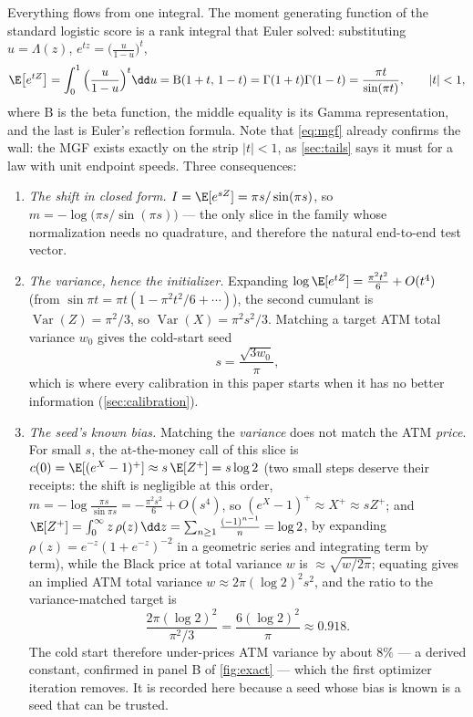 Everything flows from one integral.  The moment generating function of the
standard logistic score is a rank integral that Euler solved: substituting
$u=\Lambda(z)$, $e^{tz}=\big(\frac{u}{1-u}\big)^{t}$,
\begin{equation}
\E\big[e^{tZ}\big]
=\int_0^1\Big(\frac{u}{1-u}\Big)^{t}\dd u
=\mathrm{B}(1+t,\,1-t)
=\Gamma(1+t)\Gamma(1-t)
=\frac{\pi t}{\sin(\pi t)},
\qquad |t|<1,
\label{eq:mgf}
\end{equation}
where $\mathrm{B}$ is the beta function, the middle equality is its Gamma
representation, and the last is Euler's reflection formula.  Note that
\eqref{eq:mgf} already confirms the wall: the MGF exists exactly on the
strip $|t|<1$, as \cref{sec:tails} says it must for a law with unit
endpoint speeds.  Three consequences:
\begin{enumerate}[leftmargin=1.6em]
\item \emph{The shift in closed form.}  $I=\E[e^{sZ}]=\pi s/\sin(\pi s)$,
so $m=-\log\big(\pi s/\sin(\pi s)\big)$ --- the only slice in the family
whose normalization needs no quadrature, and therefore the natural
end-to-end test vector.
\item \emph{The variance, hence the initializer.}  Expanding
$\log\E[e^{tZ}]=\frac{\pi^2t^2}{6}+O(t^4)$ (from
$\sin\pi t=\pi t(1-\pi^2t^2/6+\cdots)$), the second cumulant is
$\operatorname{Var}(Z)=\pi^{2}/3$, so
$\operatorname{Var}(X)=\pi^{2}s^{2}/3$.  Matching a target ATM total
variance $w_0$ gives the cold-start seed
\begin{equation}
s=\frac{\sqrt{3w_0}}{\pi},
\label{eq:coldstart}
\end{equation}
which is where every calibration in this paper starts when it has no better
information (\cref{sec:calibration}).
\item \emph{The seed's known bias.}  Matching the \emph{variance} does not
match the ATM \emph{price}.  For small $s$, the at-the-money call of this
slice is $c(0)=\E[(e^{X}-1)^{+}]\approx s\,\E[Z^{+}]=s\log2$ (two small
steps deserve their receipts: the shift is negligible at this order,
$m=-\log\frac{\pi s}{\sin\pi s}=-\frac{\pi^{2}s^{2}}{6}+O(s^{4})$, so
$(e^{X}-1)^{+}\approx X^{+}\approx sZ^{+}$; and
$\E[Z^{+}]=\int_0^\infty z\,\rho(z)\,\dd z
=\sum_{n\ge1}\frac{(-1)^{n-1}}{n}=\log 2$, by expanding
$\rho(z)=e^{-z}(1+e^{-z})^{-2}$ in a geometric series and integrating
term by term), while the Black price at total variance $w$ is
$\approx\sqrt{w/2\pi}$; equating gives an implied ATM total variance
$w\approx2\pi(\log2)^{2}s^{2}$, and the ratio to the variance-matched
target is
\[
\frac{2\pi(\log 2)^{2}}{\pi^{2}/3}
=\frac{6(\log 2)^{2}}{\pi}\approx0.918 .
\]
The cold start therefore under-prices ATM variance by about $8\%$ --- a
derived constant, confirmed in panel B of \cref{fig:exact} --- which the
first optimizer iteration removes.  It is recorded here because a seed
whose bias is known is a seed that can be trusted.
\end{enumerate}

